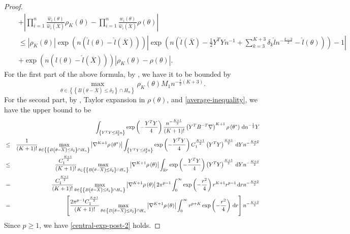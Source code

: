 \begin{proof}
\begin{eqnarray*}
 &  & +\left|\prod_{i=1}^{n}\frac{\hat{w}_{i}\left(\theta\right)}{\hat{w}_{i}\left(\overline{X}\right)}\rho_{K}\left(\theta\right)-\prod_{i=1}^{n}\frac{\hat{w}_{i}\left(\theta\right)}{\hat{w}_{i}\left(\overline{X}\right)}\rho\left(\theta\right)\right|\\
 &  & \le\left|\rho_{K}\left(\theta\right)\right|\exp\left(n\left(\hat{l}\left(\theta\right)-\hat{l}\left(\overline{X}\right)\right)\right)\left|\exp\left(n\left(\hat{l}\left(\overline{X}\right)-\frac{1}{2}Y^{T}Yn^{-1}+\sum_{k=3}^{K+3}\delta_{k}\hat{l}n^{-\frac{k-2}{2}}-\hat{l}\left(\theta\right)\right)\right)-1\right|\\
 &  & +\exp\left(n\left(\hat{l}\left(\theta\right)-\hat{l}\left(\overline{X}\right)\right)\right)\left|\rho_{K}\left(\theta\right)-\rho\left(\theta\right)\right|.
\end{eqnarray*}
For the first part of the above formula, by ,
we have it to be bounded by 
\[
\max_{\theta\in\left\{ \left\{ B\left(\theta-\overline{X}\right)\le\delta_{2}\right\} \cap H_{n}\right\} }\rho_{K}\left(\theta\right)M_{1}n^{-\frac{1}{2}\left(K+3\right)}.
\]
For the second part, by , Taylor
expansion in $\rho\left(\theta\right)$, and \eqref{average-inequality},
we have the upper bound to be 
\begin{eqnarray*}
 &  & \int_{\left\{ Y^{T}Y\le\delta_{2}^{2}n\right\} }\exp\left(-\frac{Y^{T}Y}{4}\right)\frac{n^{-\frac{K+1}{2}}}{\left(K+1\right)!}\left(Y^{T}B^{-T}\nabla\right)^{K+1}\rho\left(\theta^{*}\right)\,\mathrm{d} n^{-\frac{1}{2}}Y\\
 & \le & \frac{1}{\left(K+1\right)!}\max_{\theta\in\left\{ \left\{ B\left(\theta-\overline{X}\right)\le\delta_{2}\right\} \cap H_{n}\right\} }\left|\nabla^{K+1}\rho\left(\theta^{*}\right)\right|\int_{\left\{ Y^{T}Y\le\delta_{2}^{2}n\right\} }\exp\left(-\frac{Y^{T}Y}{4}\right)C_{1}^{\frac{K+1}{2}}\left(Y^{T}Y\right)^{\frac{K+1}{2}}\,\mathrm{d} Yn^{-\frac{K+2}{2}}\\
 & \le & \frac{C_{1}^{\frac{K+1}{2}}}{\left(K+1\right)!}\max_{\theta\in\left\{ \left\{ B\left(\theta-\overline{X}\right)\le\delta_{2}\right\} \cap H_{n}\right\} }\left|\nabla^{K+1}\rho\left(\theta\right)\right|\int_{\mathbb{R}^{p}}\exp\left(-\frac{Y^{T}Y}{4}\right)\left(Y^{T}Y\right)^{\frac{K+1}{2}}\,\mathrm{d} Yn^{-\frac{K+2}{2}}\\
 & = & \frac{C_{1}^{\frac{K+1}{2}}}{\left(K+1\right)!}\max_{\theta\in\left\{ \left\{ B\left(\theta-\overline{X}\right)\le\delta_{2}\right\} \cap H_{n}\right\} }\left|\nabla^{K+1}\rho\left(\theta\right)\right|2\pi^{p-1}\int_{0}^{\infty}\exp\left(-\frac{r^{2}}{4}\right)r^{K+1}r^{p-1}\,\mathrm{d} rn^{-\frac{K+2}{2}}\\
 & = & \left[\frac{2\pi^{p-1}C_{1}^{\frac{K+1}{2}}}{\left(K+1\right)!}\max_{\theta\in\left\{ B\left(\theta-\overline{X}\right)\le\delta_{2}\right\} \cap H_{n}}\left|\nabla^{K+1}\rho\left(\theta\right)\right|\int_{0}^{\infty}r^{p+K}\exp\left(-\frac{r^{2}}{4}\right)\,\mathrm{d} r\right]n^{-\frac{K+2}{2}}
\end{eqnarray*}
Since $p\ge1$, we have \eqref{central-exp-post-2} holds.

\end{proof}

